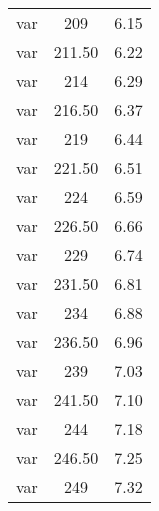 \begin{center}
\begin{longtable}[h]{ccc}
var & 209 & 6.15 \\

var & 211.50 & 6.22 \\

var & 214 & 6.29 \\

var & 216.50 & 6.37 \\

var & 219 & 6.44 \\

var & 221.50 & 6.51 \\

var & 224 & 6.59 \\

var & 226.50 & 6.66 \\

var & 229 & 6.74 \\

var & 231.50 & 6.81 \\

var & 234 & 6.88 \\

var & 236.50 & 6.96 \\

var & 239 & 7.03 \\

var & 241.50 & 7.10 \\

var & 244 & 7.18 \\

var & 246.50 & 7.25 \\

var & 249 & 7.32 \\


\end{longtable}
\end{center}
